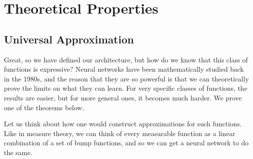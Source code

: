\section{Theoretical Properties} 

\subsection{Universal Approximation}

  Great, so we have defined our architecture, but how do we know that this class of functions is expressive? Neural networks have been mathematically studied back in the 1980s, and the reason that they are so powerful is that we can theoretically prove the limits on what they can learn. For very specific classes of functions, the results are easier, but for more general ones, it becomes much harder. We prove one of the theorems below. 

  Let us think about how one would construct approximations for such functions. Like in measure theory, we can think of every measurable function as a linear combination of a set of bump functions, and so we can get a neural network to do the same.

